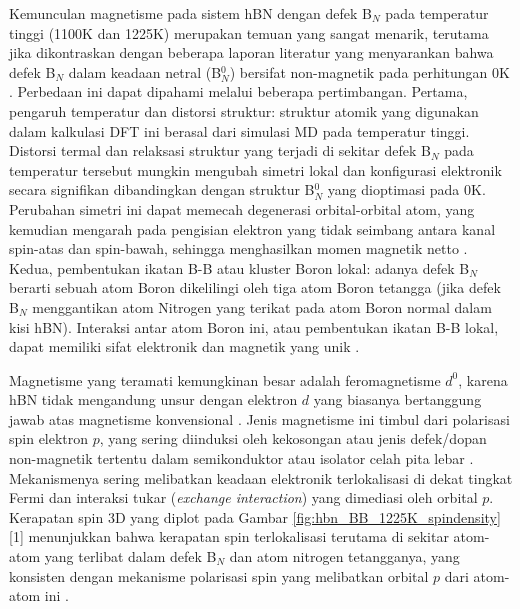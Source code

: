 Kemunculan magnetisme pada sistem hBN dengan defek B$_N$ pada temperatur tinggi (1100K dan 1225K) merupakan temuan yang sangat menarik, terutama jika dikontraskan dengan beberapa laporan literatur yang menyarankan bahwa defek B$_N$ dalam keadaan netral (B$_N^0$) bersifat non-magnetik pada perhitungan 0K \cite{[1, 4]}. Perbedaan ini dapat dipahami melalui beberapa pertimbangan. Pertama, pengaruh temperatur dan distorsi struktur: struktur atomik yang digunakan dalam kalkulasi DFT ini berasal dari simulasi MD pada temperatur tinggi. Distorsi termal dan relaksasi struktur yang terjadi di sekitar defek B$_N$ pada temperatur tersebut mungkin mengubah simetri lokal dan konfigurasi elektronik secara signifikan dibandingkan dengan struktur B$_N^0$ yang dioptimasi pada 0K. Perubahan simetri ini dapat memecah degenerasi orbital-orbital atom, yang kemudian mengarah pada pengisian elektron yang tidak seimbang antara kanal spin-atas dan spin-bawah, sehingga menghasilkan momen magnetik netto \cite{[1]}. Kedua, pembentukan ikatan B-B atau kluster Boron lokal: adanya defek B$_N$ berarti sebuah atom Boron dikelilingi oleh tiga atom Boron tetangga (jika defek B$_N$ menggantikan atom Nitrogen yang terikat pada atom Boron normal dalam kisi hBN). Interaksi antar atom Boron ini, atau pembentukan ikatan B-B lokal, dapat memiliki sifat elektronik dan magnetik yang unik \cite{[1], Ooi2006}.

Magnetisme yang teramati kemungkinan besar adalah feromagnetisme $d^0$, karena hBN tidak mengandung unsur dengan elektron $d$ yang biasanya bertanggung jawab atas magnetisme konvensional \cite{[1]}. Jenis magnetisme ini timbul dari polarisasi spin elektron $p$, yang sering diinduksi oleh kekosongan atau jenis defek/dopan non-magnetik tertentu dalam semikonduktor atau isolator celah pita lebar \cite{[1], Zunger2009}. Mekanismenya sering melibatkan keadaan elektronik terlokalisasi di dekat tingkat Fermi dan interaksi tukar (\textit{exchange interaction}) yang dimediasi oleh orbital $p$. Kerapatan spin 3D yang diplot pada Gambar \ref{fig:hbn_BB_1225K_spindensity} [1] menunjukkan bahwa kerapatan spin terlokalisasi terutama di sekitar atom-atom yang terlibat dalam defek B$_N$ dan atom nitrogen tetangganya, yang konsisten dengan mekanisme polarisasi spin yang melibatkan orbital $p$ dari atom-atom ini \cite{[1]}.

